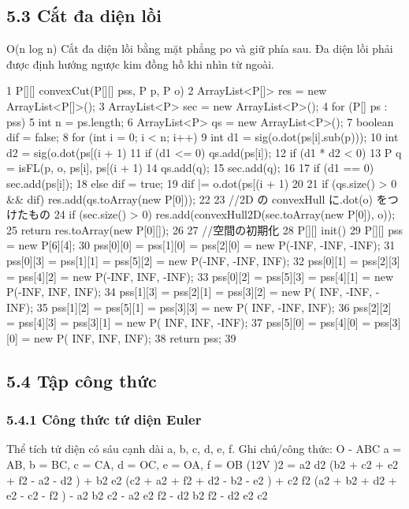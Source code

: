\documentclass[11pt]{article}
\begin{document}
\subsection{5.3 Cắt đa diện lồi}
\begin{NoteBlock}
O(n log n)
Cắt đa diện lồi bằng mặt phẳng po và giữ phía sau.
Đa diện lồi phải được định hướng ngược kim đồng hồ khi nhìn từ ngoài.
\end{NoteBlock}
\begin{Code}
1 P[][] convexCut(P[][] pss, P p, P o) {
2 ArrayList<P[]> res = new ArrayList<P[]>();
3 ArrayList<P> sec = new ArrayList<P>();
4 for (P[] ps : pss) {
5 int n = ps.length;
6 ArrayList<P> qs = new ArrayList<P>();
7 boolean dif = false;
8 for (int i = 0; i < n; i++) {
9 int d1 = sig(o.dot(ps[i].sub(p)));
10 int d2 = sig(o.dot(ps[(i + 1) %
11 if (d1 <= 0) qs.add(ps[i]);
12 if (d1 * d2 < 0) {
13 P q = isFL(p, o, ps[i], ps[(i + 1) %
14 qs.add(q);
15 sec.add(q);
16 }
17 if (d1 == 0) sec.add(ps[i]);
18 else dif = true;
19 dif |= o.dot(ps[(i + 1) %
20 }
21 if (qs.size() > 0 && dif) res.add(qs.toArray(new P[0]));
22 }
23 //2D の convexHull に.dot(o) をつけたもの
24 if (sec.size() > 0) res.add(convexHull2D(sec.toArray(new P[0]), o));
25 return res.toArray(new P[0][]);
26 }
27 //空間の初期化
28 P[][] init() {
29 P[][] pss = new P[6][4];
30 pss[0][0] = pss[1][0] = pss[2][0] = new P(-INF, -INF, -INF);
31 pss[0][3] = pss[1][1] = pss[5][2] = new P(-INF, -INF, INF);
32 pss[0][1] = pss[2][3] = pss[4][2] = new P(-INF, INF, -INF);
33 pss[0][2] = pss[5][3] = pss[4][1] = new P(-INF, INF, INF);
34 pss[1][3] = pss[2][1] = pss[3][2] = new P( INF, -INF, -INF);
35 pss[1][2] = pss[5][1] = pss[3][3] = new P( INF, -INF, INF);
36 pss[2][2] = pss[4][3] = pss[3][1] = new P( INF, INF, -INF);
37 pss[5][0] = pss[4][0] = pss[3][0] = new P( INF, INF, INF);
38 return pss;
39 }
\end{Code}
\subsection{5.4 Tập công thức}
\subsubsection{5.4.1 Công thức tứ diện Euler}
\begin{NoteBlock}
Thể tích tứ diện có sáu cạnh dài a, b, c, d, e, f.
Ghi chú/công thức: O - ABC   a = AB, b = BC, c = CA, d = OC, e = OA, f = OB
(12V )2
= a2
d2
(b2
+ c2
+ e2
+ f2
- a2
- d2
) + b2
e2
(c2
+ a2
+ f2
+ d2
- b2
- e2
) + c2
f2
(a2
+ b2
+ d2
+ e2
-
c2
- f2
) - a2
b2
c2
- a2
e2
f2
- d2
b2
f2
- d2
e2
c2
\end{NoteBlock}
\end{document}
